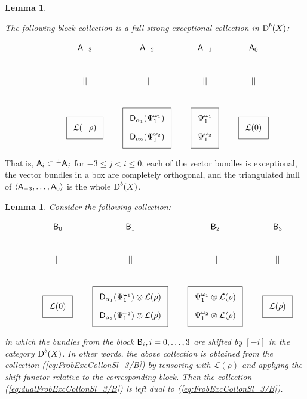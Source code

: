 \documentclass[sn-mathphys-num]{sn-jnl}%
\newcommand{\Ll}{\mathcal L}
\newcommand*{\Dd}{\mathop{\mathrm D\kern0pt}\nolimits}
\newcommand{\A}{{\sf A}}
\newcommand{\B}{{\sf B}}
\newcommand{\bh}{\mathbf H}
\newtheorem{lemma}[theorem]{Lemma}
\theoremstyle{definition}
\begin{document}
\begin{lemma}\label{lem:A_2-Demazure-FEC}

The following block collection is a full strong exceptional collection in $\Dd ^b(X)$:


\begin{equation}\label{eq:FrobExcCollonSl_3/B}
\xymatrix{
& \A _{-3}& \A _{-2}& \A _{-1}& \A _0\\
& || & || & || & || \\
&*++<10pt>[F]\txt{$\Ll (-\rho)$}
&*++<10pt>[F]\txt{${\sf D}_{\alpha _1}(\Psi _1^{\omega _1})$  \\ \\ ${\sf D}_{\alpha _2}(\Psi _1^{\omega _2})$}
&*++<10pt>[F]\txt{$\Psi _1^{\omega _1}$  \\ \\ $\Psi _1^{\omega _2}  $}
 &*++<10pt>[F]\txt{$\Ll (0)$}
}
\end{equation}
\end{lemma}

That is, $\A _{i}\subset {^{\perp}\A _{j}}$ for $-3\leq j<i\leq 0$,
each of the vector bundles is exceptional, the vector bundles in a box are completely orthogonal, and the triangulated hull of $\langle 
{\sf A}_{-3},\dots,{\sf A}_0\rangle$ is the whole $\Dd ^b(X)$. 

\begin{lemma}\label{lem:dualA_2-Demazure-FEC}
Consider the following collection:

\begin{equation}\label{eq:dualFrobExcCollonSl_3/B}
\xymatrix{
& \B _{0}& \B _{1}& \B _{2}& \B _3\\
& || & || & || & || \\
&*++<10pt>[F]\txt{$\Ll (0)$}
&*++<10pt>[F]\txt{${\sf D}_{\alpha _1}(\Psi _1^{\omega _1})\otimes \Ll (\rho)$  \\ \\ ${\sf D}_{\alpha _2}(\Psi _1^{\omega _2})\otimes \Ll (\rho)$}
&*++<10pt>[F]\txt{$\Psi _1^{\omega _1}\otimes \Ll (\rho)$  \\ \\ $\Psi _1^{\omega _2}\otimes \Ll (\rho)$}
 &*++<10pt>[F]\txt{$\Ll (\rho)$}
}
\end{equation}

\noindent
in which the bundles from the block ${\B _i}, i=0,\dots,3$ are shifted by $[-i]$ in the category $\Dd ^b(X)$. In other words, the above collection is obtained from the collection (\ref{eq:FrobExcCollonSl_3/B}) by tensoring with $\Ll (\rho)$ and applying the shift functor relative to the corresponding block. Then the collection (\ref{eq:dualFrobExcCollonSl_3/B}) is left dual to (\ref{eq:FrobExcCollonSl_3/B}).
\end{lemma}
\end{document}
